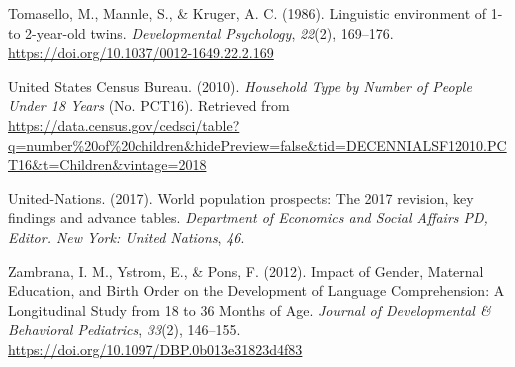 \documentclass[
  man,floatsintext]{apa6}
\newlength{\cslhangindent}
\newlength{\cslentryspacingunit} %
\newenvironment{CSLReferences}[2] %
 {%
  \setlength{\parindent}{0pt}
  \ifodd #1
  \let\oldpar\par
  \def\par{\hangindent=\cslhangindent\oldpar}
  \fi
  \setlength{\parskip}{#2\cslentryspacingunit}
 }%
 {}
\begin{document}
\begin{CSLReferences}{1}{0}
\leavevmode{}%
Tomasello, M., Mannle, S., \& Kruger, A. C. (1986). Linguistic environment of 1- to 2-year-old twins. \emph{Developmental Psychology}, \emph{22}(2), 169--176. \url{https://doi.org/10.1037/0012-1649.22.2.169}

\leavevmode{}%
United States Census Bureau. (2010). \emph{Household {Type} by {Number} of {People} {Under} 18 {Years}} (No. PCT16). Retrieved from \url{https://data.census.gov/cedsci/table?q=number\%20of\%20children\&hidePreview=false\&tid=DECENNIALSF12010.PCT16\&t=Children\&vintage=2018}

\leavevmode{}%
United-Nations. (2017). World population prospects: The 2017 revision, key findings and advance tables. \emph{Department of Economics and Social Affairs PD, Editor. New York: United Nations}, \emph{46}.

\leavevmode{}%
Zambrana, I. M., Ystrom, E., \& Pons, F. (2012). Impact of {Gender}, {Maternal} {Education}, and {Birth} {Order} on the {Development} of {Language} {Comprehension}: {A} {Longitudinal} {Study} from 18 to 36 {Months} of {Age}. \emph{Journal of Developmental \& Behavioral Pediatrics}, \emph{33}(2), 146--155. \url{https://doi.org/10.1097/DBP.0b013e31823d4f83}

\end{CSLReferences}

\endgroup
\end{document}
